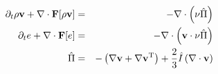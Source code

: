 \begin{eqnarray*}
\partial_t \rho{\bf v} + \nabla\cdot {\bf F}[\rho{\bf v}]&=&-\nabla\cdot\left(\nu\hat{\Pi}\right)\\
\partial_t
 e + \nabla\cdot {\bf F}[e]&=&-\nabla\cdot\left({\bf v}\cdot\nu\hat{\Pi}\right)
\\
\hat{\Pi}&=&- \left(\nabla{\bf v} + \nabla{\bf v}^{\rm T}\right)
+\frac{2}{3}\hat I\left( \nabla\cdot{\bf v}\right)
\end{eqnarray*}
